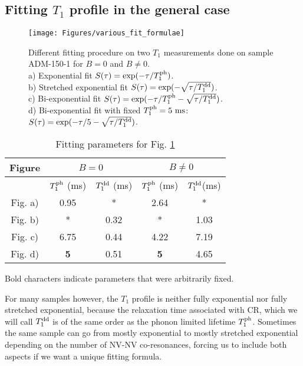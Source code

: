 \documentclass[a4paper,11pt]{report}
\begin{document}
\subsection{Fitting $T_1$ profile in the general case}

\begin{figure}[h]
\centering
\texttt{[image: Figures/various\_fit\_formulae]}
\caption{Different fitting procedure on two $T_1$ measurements done on sample ADM-150-1 for $B=0$ and $B\neq0$. \\ a) Exponential fit $S(\tau)=\exp (-\tau/T_1^{\rm ph})$. \\ b) Stretched exponential fit $S(\tau)=\exp (-\sqrt{\tau/T_1^{\rm dd}})$. \\ c) Bi-exponential fit $S(\tau)=\exp (-\tau/T_1^{\rm ph} -\sqrt{\tau/T_1^{\rm dd}})$. \\ d) Bi-exponential fit with fixed $T_1^{\rm ph}=5\ \rm ms$: $S(\tau)=\exp (-\tau/5 -\sqrt{\tau/T_1^{\rm dd}})$.}
\label{various_fit_formulae}
\end{figure}

\begin{table}[htbp]
\centering
\caption{Fitting parameters for Fig.
 \ref{various_fit_formulae}}
 \label{fitting table}
\begin{tabular}{c|cc|cc}
\toprule
Figure &  \multicolumn{2}{c}{$B=0$} & \multicolumn{2}{c}{$B\neq0$}\\
\midrule
{} &  $T_1^{\rm ph}$ (ms)& $T_1^{\rm dd}$ (ms)&  $T_1^{\rm ph}$ (ms)& $T_1^{\rm dd}$(ms)\\
Fig. a) & 0.95 & * & 2.64 & * \\
Fig. b) & * & 0.32 & * & 1.03  \\
Fig. c) & 6.75 & 0.44 & 4.22 & 7.19 \\
Fig. d) & \textbf{5} & 0.51 & \textbf{5} & 4.65 \\
\bottomrule
\end{tabular}

Bold characters indicate parameters that were arbitrarily fixed.
  
\end{table}

For many samples however, the $T_1$ profile is neither fully exponential nor fully stretched exponential, because the relaxation time associated with CR, which we will call $T_1^{\rm dd}$ is of the same order as the phonon limited lifetime $T_1^{\rm ph}$. Sometimes the same sample can go from mostly exponential to mostly stretched exponential depending on the number of NV-NV co-resonances, forcing us to include both aspects if we want a unique fitting formula.
\end{document}
